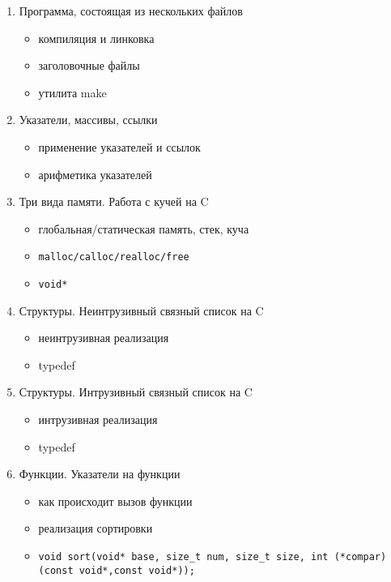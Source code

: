 % 
% 

\begin{enumerate}[noitemsep]
\item{Программа, состоящая из нескольких файлов}
\begin{itemize}[noitemsep]
    \item компиляция и линковка
    \item заголовочные файлы
    \item утилита make
\end{itemize}
\item{Указатели, массивы, ссылки}
\begin{itemize}[noitemsep]
    \item применение указателей и ссылок
    \item арифметика указателей
\end{itemize}
\item{Три вида памяти. Работа с кучей на C}
\begin{itemize}[noitemsep]
    \item глобальная/статическая память, стек, куча
    \item \begin{verbatim}malloc/calloc/realloc/free\end{verbatim}
    \item \begin{verbatim}void*\end{verbatim}
\end{itemize}
\item{Структуры. Неинтрузивный связный список на C}
\begin{itemize}[noitemsep]
    \item неинтрузивная реализация
    \item typedef
\end{itemize}
\item{Структуры. Интрузивный связный список на C}
\begin{itemize}[noitemsep]
    \item интрузивная реализация
    \item typedef
\end{itemize}
\item{Функции. Указатели на функции}
\begin{itemize}[noitemsep]
    \item как происходит вызов функции
    \item реализация сортировки
    \item \begin{verbatim}void sort(void* base, size_t num, size_t size, int (*compar)(const void*,const void*));\end{verbatim}

\end{itemize}
\end{enumerate}
